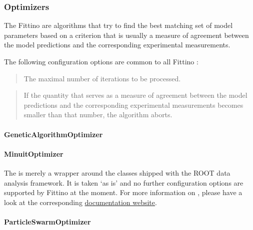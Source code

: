 \documentclass[letterpaper,10pt,english]{sphinxmanual}
\begin{document}
\subsubsection{Optimizers}
\label{optimizers::doc}\label{optimizers:optimizers}
The Fittino  are algorithms that try to find the best matching set of model parameters
based on a criterion that is usually a measure of agreement between the model predictions and the
corresponding experimental measurements.

The following configuration options are common to all Fittino :

\begin{quote}

The maximal number of iterations to be processed.
\end{quote}

\begin{quote}

If the quantity that serves as a measure of agreement between the model predictions and the
corresponding experimental measurements becomes smaller than that number, the algorithm aborts.
\end{quote}


\paragraph{GeneticAlgorithmOptimizer}
\label{genetic_algorithm_optimizer:geneticalgorithmoptimizer}\label{genetic_algorithm_optimizer::doc}



\paragraph{MinuitOptimizer}
\label{minuit_optimizer:minuitoptimizer}\label{minuit_optimizer::doc}
The  is merely a wrapper around the  classes shipped with the ROOT
data analysis framework. It is taken `as is' and no further configuration options are supported by
Fittino at the moment. For more information on , please have a look at the corresponding
\href{https://root.cern.ch/root/html604/MATH\_MINUIT2\_Index.html}{documentation website}.


\paragraph{ParticleSwarmOptimizer}
\label{particle_swarm_optimizer:particleswarmoptimizer}\label{particle_swarm_optimizer::doc}
\end{document}
